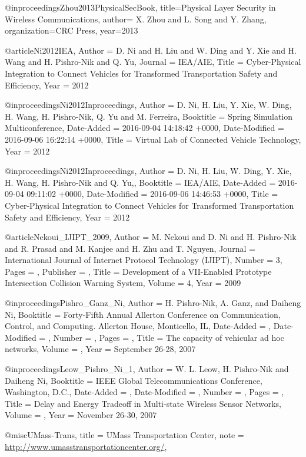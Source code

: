 {{{{@inproceedings{Zhou2013PhysicalSecBook,
	title={Physical Layer Security in Wireless Communications},
	author={ X. Zhou and L. Song and Y. Zhang},
	organization={CRC Press},
	year={2013}
}

@article{Ni2012IEA,
	Author = {D. Ni and H. Liu and W. Ding and  Y. Xie and H. Wang and H. Pishro-Nik and Q. Yu},
	Journal = {IEA/AIE},
	Title = {Cyber-Physical Integration to Connect Vehicles for Transformed Transportation Safety and Efficiency},
	Year = {2012}}



@inproceedings{Ni2012Inproceedings,
	Author = {D. Ni, H. Liu, Y. Xie, W. Ding, H. Wang, H. Pishro-Nik, Q. Yu and M. Ferreira},
	Booktitle = {Spring Simulation Multiconference},
	Date-Added = {2016-09-04 14:18:42 +0000},
	Date-Modified = {2016-09-06 16:22:14 +0000},
	Title = {Virtual Lab of Connected Vehicle Technology},
	Year = {2012}}

@inproceedings{Ni2012Inproceedings,
	Author = {D. Ni, H. Liu, W. Ding, Y. Xie, H. Wang, H. Pishro-Nik and Q. Yu,},
	Booktitle = {IEA/AIE},
	Date-Added = {2016-09-04 09:11:02 +0000},
	Date-Modified = {2016-09-06 14:46:53 +0000},
	Title = {Cyber-Physical Integration to Connect Vehicles for Transformed Transportation Safety and Efficiency},
	Year = {2012}}


@article{Nekoui_IJIPT_2009,
	Author = {M. Nekoui and D. Ni and H. Pishro-Nik and R. Prasad and M. Kanjee and H. Zhu and T. Nguyen},
	Journal = {International Journal of Internet Protocol Technology (IJIPT)},
	Number = {3},
	Pages = {},
	Publisher = {},
	Title = {Development of a VII-Enabled Prototype Intersection Collision Warning System},
	Volume = {4},
	Year = {2009}}


@inproceedings{Pishro_Ganz_Ni,
	Author = {H. Pishro-Nik, A. Ganz, and Daiheng Ni},
	Booktitle = {Forty-Fifth Annual Allerton Conference on Communication, Control, and Computing. Allerton House, Monticello, IL},
	Date-Added = {},
	Date-Modified = {},
	Number = {},
	Pages = {},
	Title = {The capacity of vehicular ad hoc networks},
	Volume = {},
	Year = {September 26-28, 2007}}

@inproceedings{Leow_Pishro_Ni_1,
	Author = {W. L. Leow, H. Pishro-Nik and Daiheng Ni},
	Booktitle = {IEEE Global Telecommunications Conference, Washington, D.C.},
	Date-Added = {},
	Date-Modified = {},
	Number = {},
	Pages = {},
	Title = {Delay and Energy Tradeoff in Multi-state Wireless Sensor Networks},
	Volume = {},
	Year = {November 26-30, 2007}}


@misc{UMass-Trans,
	title = {{UMass Transportation Center}},
	note = {\url{http://www.umasstransportationcenter.org/}},
}


}}}}
